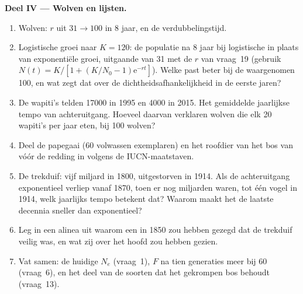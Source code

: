 \begin{problem}
\medskip
\noindent\textbf{Deel IV --- Wolven en lijsten.}
\begin{enumerate}[resume]
  \item Wolven: $r$ uit $31 \to 100$ in 8 jaar, en de verdubbelingstijd.
  \item Logistische groei naar $K = 120$: de populatie na 8 jaar bij
        logistische in plaats van exponentiële groei, uitgaande van 31
        met de $r$ van vraag~19 (gebruik $N(t) = K/[1 + (K/N_{0} -
        1)\mathrm{e}^{-rt}]$). Welke past beter bij de waargenomen 100,
        en wat zegt dat over de dichtheidsafhankelijkheid in de eerste
        jaren?
  \item De wapiti's telden \num{17000} in 1995 en \num{4000} in 2015.
        Het gemiddelde jaarlijkse tempo van achteruitgang. Hoeveel
        daarvan verklaren wolven die elk \num{20} wapiti's per jaar
        eten, bij 100 wolven?
  \item Deel de papegaai (60 volwassen exemplaren) en het roofdier van
        het bos van vóór de redding in volgens de IUCN-maatstaven.
  \item De trekduif: vijf miljard in 1800, uitgestorven in 1914. Als de
        achteruitgang exponentieel verliep vanaf 1870, toen er nog
        miljarden waren, tot één vogel in 1914, welk jaarlijks tempo
        betekent dat? Waarom maakt het  de laatste decennia
        sneller dan exponentieel?
  \item Leg in een alinea uit waarom een  in 1850 zou hebben gezegd dat de trekduif
        veilig was, en wat zij over het hoofd zou hebben gezien.
  \item Vat samen: de huidige $N_{e}$ (vraag~1), $F$ na tien generaties
        meer bij 60 (vraag~6), en het deel van de soorten dat het
        gekrompen bos behoudt (vraag~13).
\end{enumerate}
\end{problem}
